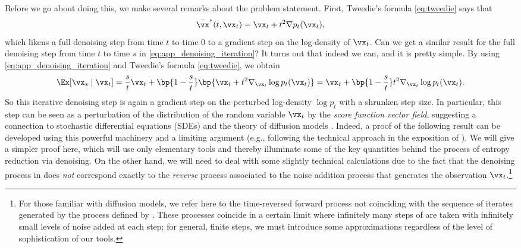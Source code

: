 \documentclass[../../book-main.tex]{subfiles}
\begin{document}
Before we go about doing this, we make several remarks about the
problem statement. First, Tweedie's formula \eqref{eq:tweedie} says that
\begin{equation}
    \bar{\vx}^{\ast}(t, \vx_{t}) = \vx_{t} + t^{2}\nabla p_{t}(\vx_{t}),
\end{equation}
which likens a full denoising step from time \(t\) to time \(0\) to a
gradient step on the log-density of \(\vx_{t}\). Can we get a similar
result for the full denoising step from time \(t\) to time \(s\) in
\eqref{eq:app_denoising_iteration}? It turns out that indeed we can,
and it is pretty simple. By using \eqref{eq:app_denoising_iteration}
and Tweedie's formula \eqref{eq:tweedie}, we obtain
\begin{equation}\label{eq:app_denoising_iteration_score}
    \Ex[\vx_{s} \mid \vx_{t}] = \frac{s}{t}\vx_{t} + \bp{1 -
    \frac{s}{t}}\bp{\vx_{t} + t^{2}\nabla_{\vx_{t}}\log
    p_{t}(\vx_{t})} = \vx_{t} + \bp{1 -
    \frac{s}{t}}t^{2}\nabla_{\vx_{t}}\log p_{t}(\vx_{t}).
\end{equation}
So this iterative denoising step is again a gradient step on the
perturbed log-density \(\log p_{t}\) with a shrunken step size. In
particular, this step can be seen as a perturbation of the
distribution of the random variable \(\vx_{t}\) by the \textit{score
function vector field}, suggesting a connection to stochastic
differential equations (SDEs) and the theory of diffusion models
\cite{song2020score}. Indeed, a proof of the following result
 can be developed using this
powerful machinery and a limiting argument (e.g., following the
    technical approach in the exposition of
\cite{DBLP:conf/iclr/ChenC0LSZ23}). We will give a simpler proof
here, which will use only elementary tools and  thereby illuminate
some of the key quantities behind the process of entropy reduction
via denoising. On the other hand, we will need to deal with some
slightly technical calculations due to the fact that the denoising
process in  does \textit{not}
correspond exactly to the \textit{reverse} process associated to the
noise addition process that generates the observation
\(\vx_{t}\).\footnote{For those familiar with diffusion models, we
    refer here to the time-reversed forward process not coinciding with
    the sequence of iterates generated by the process defined by
    . These processes coincide in
    a certain limit where infinitely many steps of
     are taken with infinitely
    small levels of noise added at each step; for general, finite steps,
    we must introduce some approximations regardless of the level of
sophistication of our tools.}
\end{document}
